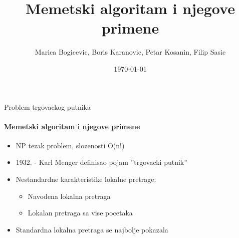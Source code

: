 \documentclass{beamer}
\title{Memetski algoritam i njegove primene}
\subtitle{}
\date{\today}
\author{Marica Bogicevic, Boris Karanovic, Petar Kosanin, Filip Sasic}
\institute{Matematicki Fakultet}
\begin{document}
\maketitle


  



\begin{frame}[fragile]{Problem trgovackog putnika}
  \framesubtitle{Memetski algoritam i njegove primene}
  
   \begin{itemize}
    \item{NP tezak problem, slozenosti O(n!)}
    \item{1932. - Karl Menger definisao pojam ''trgovacki putnik'' }
     \item{Nestandardne karakteristike lokalne pretrage:}
        \begin{itemize}
             \item{Navodena lokalna pretraga}
             \item{Lokalan pretraga sa vise pocetaka}
        \end{itemize}
     \item{Standardna lokalna pretraga se najbolje pokazala}
  \end{itemize}

\end{frame}
\end{document}
